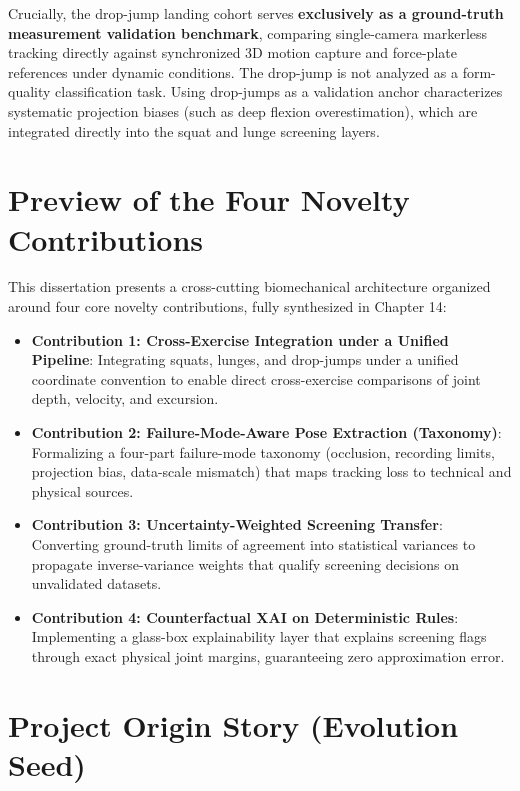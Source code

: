 Crucially, the drop-jump landing cohort serves \textbf{exclusively as a ground-truth measurement validation benchmark}, comparing single-camera markerless tracking directly against synchronized 3D motion capture and force-plate references under dynamic conditions. The drop-jump is not analyzed as a form-quality classification task. Using drop-jumps as a validation anchor characterizes systematic projection biases (such as deep flexion overestimation), which are integrated directly into the squat and lunge screening layers.



\section{Preview of the Four Novelty Contributions}
\label{sec:1-3-preview-of-the-four-novelty-contributions}


This dissertation presents a cross-cutting biomechanical architecture organized around four core novelty contributions, fully synthesized in Chapter 14:
\begin{itemize}
  \item \textbf{Contribution 1: Cross-Exercise Integration under a Unified Pipeline}: Integrating squats, lunges, and drop-jumps under a unified coordinate convention to enable direct cross-exercise comparisons of joint depth, velocity, and excursion.
  \item \textbf{Contribution 2: Failure-Mode-Aware Pose Extraction (Taxonomy)}: Formalizing a four-part failure-mode taxonomy (occlusion, recording limits, projection bias, data-scale mismatch) that maps tracking loss to technical and physical sources.
  \item \textbf{Contribution 3: Uncertainty-Weighted Screening Transfer}: Converting ground-truth limits of agreement into statistical variances to propagate inverse-variance weights that qualify screening decisions on unvalidated datasets.
  \item \textbf{Contribution 4: Counterfactual XAI on Deterministic Rules}: Implementing a glass-box explainability layer that explains screening flags through exact physical joint margins, guaranteeing zero approximation error.
\end{itemize}



\section{Project Origin Story (Evolution Seed)}
\label{sec:1-4-project-origin-story-evolution-seed}


